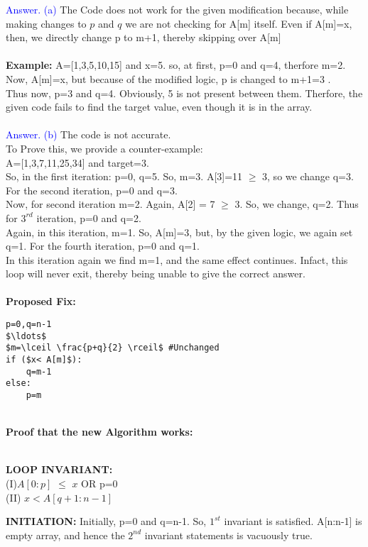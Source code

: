 \documentclass{article}
\begin{document}
\newpage
\textcolor{blue}{Answer. (a)} The Code does not work for the given modification because, while making changes to $p$ and $q$
we are not checking for A[m] itself. Even if A[m]=x, then, we directly change p to m+1, thereby skipping over A[m]
\\
\\
\textbf{Example:} A=[1,3,5,10,15] and x=5. so, at first, p=0 and q=4, therfore m=2. Now, A[m]=x, but because of the modified logic, p is changed to m+1=3
.\\
Thus now, p=3 and q=4. Obviously, 5 is not present between them. Therfore, the given code fails to find the target value, even though it is in the array.
\\
\\
\textcolor{blue}{Answer. (b)} The code is not accurate. \\ To Prove this, we provide a counter-example:
\\
A=[1,3,7,11,25,34] and target=3. \\
So, in the first iteration: p=0, q=5. So, m=3.
A[3]=11 $\ge$ 3, so we change q=3. For the second iteration, p=0 and q=3. \\ Now, for second iteration m=2. Again, A[2] = 7 $\geq$ 3. So, we change, q=2. 
Thus for $3^{rd}$ iteration, p=0 and q=2.\\ Again, in this iteration, m=1. So, A[m]=3, but, by the given logic, we again set q=1. For the fourth iteration, p=0 and q=1.
\\In this iteration again we find m=1, and the same effect continues. Infact, this loop will never exit, thereby being unable to give the correct answer.
\leavevmode
\\
\\
\textbf{Proposed Fix:}
\begin{lstlisting}[mathescape=true]
p=0,q=n-1 
$\ldots$
$m=\lceil \frac{p+q}{2} \rceil$ #Unchanged
if ($x< A[m]$):
    q=m-1
else:
    p=m
\end{lstlisting}
\leavevmode
\\
\textbf{Proof that the new Algorithm works:}
\\
\\
\begin{center}
    \textbf{LOOP INVARIANT:} \\ (I)$A[0:p]$ $\leq$ $x$ OR p=0 \\
                                (II) $x<A[q+1:n-1]$
\end{center}
\textbf{INITIATION:} Initially, p=0 and q=n-1. So, $1^{st}$ invariant is satisfied. A[n:n-1] is empty array, and hence the $2^{nd}$ invariant statements is vacuously true.
\end{document}
